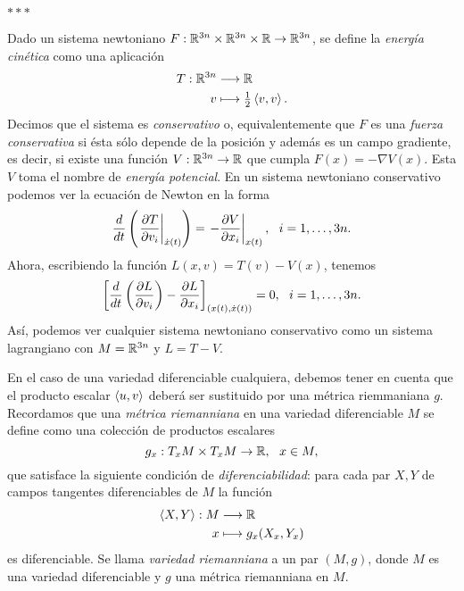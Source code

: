   \begin{center}  $\ast\ast\ast$ \end{center}
  Dado un sistema newtoniano $F:\mathbb{R}^{3n}\times\mathbb{R}^{3n}\times\mathbb{R} \rightarrow \mathbb{R}^{3n}$, se define la \emph{energía cinética} como una aplicación
  \begin{align*}
    T: \mathbb{R}^{3n} & \longrightarrow \mathbb{R} \\
    v & \longmapsto \tfrac{1}{2} \left\langle v,v\right\rangle.
  \end{align*}
  Decimos que el sistema es \emph{conservativo} o, equivalentemente que $F$ es una \emph{fuerza conservativa} si ésta sólo depende de la posición y además es un campo gradiente, es decir, si existe una función $V:\mathbb{R}^{3n}\rightarrow \mathbb{R}$ que cumpla $F(x)=-\nabla V(x)$. Esta $V$ toma el nombre de \emph{energía potencial}.
  En un sistema newtoniano conservativo podemos ver la ecuación de Newton en la forma
  \begin{equation*}
    \frac{d}{dt} \left( \left. \parcial{T}{v_i} \right|_{\dot{x}(t)} \right) = \left.-\parcial{V}{x_i}\right|_{x(t)}, \ \ i=1,\dots,3n.
  \end{equation*}
  Ahora, escribiendo la función $L(x,v)=T(v)-V(x)$, tenemos
  \begin{equation*}
    \left[\frac{d}{dt}\left( \frac{\partial L}{\partial v_i} \right) - \frac{\partial L}{\partial x_i}\right]_{(x(t),\dot{x}(t))} = 0, \ \  i=1,\dots,3n.
  \end{equation*}
  Así, podemos ver cualquier sistema newtoniano conservativo como un sistema lagrangiano con $M=\mathbb{R}^{3n}$ y $L=T-V$.

  En el caso de una variedad diferenciable cualquiera, debemos tener en cuenta que el producto escalar $\left\langle u,v\right\rangle$ deberá ser sustituido por una métrica riemmaniana $g$. Recordamos que una \emph{métrica riemanniana} en una variedad diferenciable $M$ se define como una colección de productos escalares
  \begin{equation*}
    g_x: T_xM \times T_xM \rightarrow \mathbb{R}, \ \ x\in M,  
  \end{equation*}
  que satisface la siguiente condición de \emph{diferenciabilidad}: para cada par $X,Y$ de campos tangentes diferenciables de $M$ la función
  \begin{align*}
    \left\langle X,Y\right\rangle: M & \longrightarrow \mathbb{R} \\
    x & \longmapsto g_x(X_x,Y_x)
  \end{align*}
  es diferenciable. Se llama \emph{variedad riemanniana} a un par $(M,g)$, donde $M$ es una variedad diferenciable y $g$ una métrica riemanniana en $M$.
  
